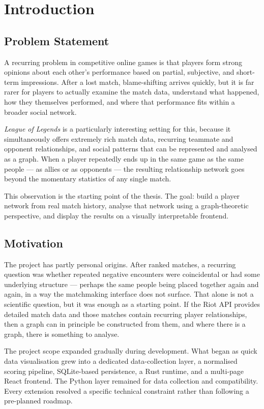 \chapter{Introduction}

\section{Problem Statement}

A recurring problem in competitive online games is that players form strong opinions about each other's performance based on partial, subjective, and short-term impressions. After a lost match, blame-shifting arrives quickly, but it is far rarer for players to actually examine the match data, understand what happened, how they themselves performed, and where that performance fits within a broader social network.

\emph{League of Legends} is a particularly interesting setting for this, because it simultaneously offers extremely rich match data, recurring teammate and opponent relationships, and social patterns that can be represented and analysed as a graph. When a player repeatedly ends up in the same game as the same people --- as allies or as opponents --- the resulting relationship network goes beyond the momentary statistics of any single match.

This observation is the starting point of the thesis. The goal: build a player network from real match history, analyse that network using a graph-theoretic perspective, and display the results on a visually interpretable frontend.

\section{Motivation}

The project has partly personal origins. After ranked matches, a recurring question was whether repeated negative encounters were coincidental or had some underlying structure --- perhaps the same people being placed together again and again, in a way the matchmaking interface does not surface. That alone is not a scientific question, but it was enough as a starting point. If the Riot API provides detailed match data and those matches contain recurring player relationships, then a graph can in principle be constructed from them, and where there is a graph, there is something to analyse.

The project scope expanded gradually during development. What began as quick data visualisation grew into a dedicated data-collection layer, a normalised scoring pipeline, SQLite-based persistence, a Rust runtime, and a multi-page React frontend. The Python layer remained for data collection and compatibility. Every extension resolved a specific technical constraint rather than following a pre-planned roadmap.

